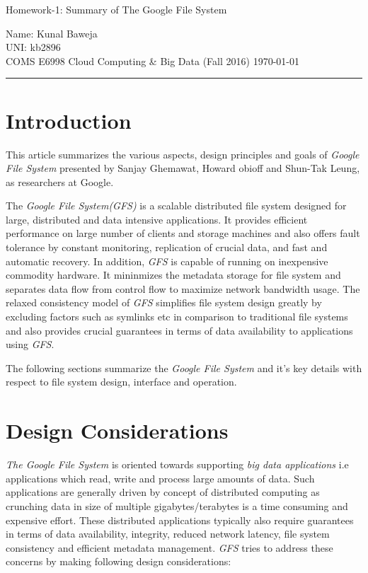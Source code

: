 \documentclass[12pt, a4paper]{article}
\def\name{Kunal Baweja}
\def\uni{kb2896}
\def\assignment{Homework-1: Summary of The Google File System}
\def\subject{COMS E6998 Cloud Computing \& Big Data (Fall 2016)}
\begin{document}
\begin{center}
    {\Large \assignment}
    \vspace{0.1em}
\end{center}

Name: {\name}\\
UNI: {\uni}\\
{\subject} \hfill {\today}

\rule{\textwidth}{0.2pt}

\section*{Introduction}
This article summarizes the various aspects, design principles and goals of \textit{Google File System}\cite{Ghemawat:2003:GFS:945445.945450} presented by Sanjay Ghemawat, Howard obioff and Shun-Tak Leung, as researchers at Google.\par

The \textit{Google File System(GFS)}\cite{Ghemawat:2003:GFS:945445.945450} is a scalable distributed file system designed for large, distributed and data intensive applications. It provides efficient performance on large number of clients and storage machines and also offers fault tolerance by constant monitoring, replication of crucial data, and fast and automatic recovery. In addition, \textit{GFS}\cite{Ghemawat:2003:GFS:945445.945450} is capable of running on inexpensive commodity hardware. It mininmizes the metadata storage for file system and separates data flow from control flow to maximize network bandwidth usage. The relaxed consistency model of \textit{GFS}\cite{Ghemawat:2003:GFS:945445.945450} simplifies file system design greatly by excluding factors such as symlinks etc in comparison to traditional file systems and also provides crucial guarantees in terms of data availability to applications using \textit{GFS}\cite{Ghemawat:2003:GFS:945445.945450}.\par

The following sections summarize the \textit{Google File System}\cite{Ghemawat:2003:GFS:945445.945450} and it's key details with respect to file system design, interface and operation.

\section*{Design Considerations}
\textit{The Google File System}\cite{Ghemawat:2003:GFS:945445.945450} is oriented towards supporting \textit{big data applications} i.e applications which read, write and process large amounts of data. Such applications are generally driven by concept of distributed computing as crunching data in size of multiple gigabytes/terabytes is a time consuming and expensive effort. These distributed applications typically also require guarantees in terms of data availability, integrity, reduced network latency, file system consistency and efficient metadata management. \textit{GFS}\cite{Ghemawat:2003:GFS:945445.945450} tries to address these concerns by making following design considerations:
\end{document}
